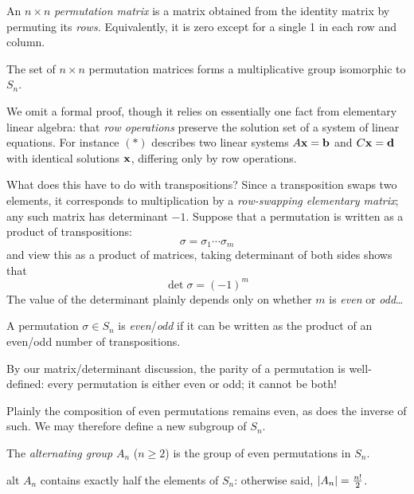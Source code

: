 \begin{defn}{}{}
	An $n\times n$ \emph{permutation matrix} is a matrix obtained from the identity matrix by permuting its \emph{rows.} Equivalently, it is zero except for a single 1 in each row and column.
\end{defn}

\begin{lemm}{}{}
	The set of $n\times n$ permutation matrices forms a multiplicative group isomorphic to $S_n$.
\end{lemm}

We omit a formal proof, though it relies on essentially one fact from elementary linear algebra: that \emph{row operations} preserve the solution set of a system of linear equations. For instance $(\ast)$ describes two linear systems $A{\mathbf{x}}={\mathbf{b}}$ and $C{\mathbf{x}}={\mathbf{d}}$ with identical solutions ${\mathbf{x}}$, differing only by row operations.
\smallbreak

What does this have to do with transpositions? Since a transposition swaps two elements, it corresponds to multiplication by a \emph{row-swapping elementary matrix}; any such matrix has determinant $-1$. Suppose that a permutation is written as a product of transpositions:
\[
	\sigma=\sigma_1\cdots\sigma_m
\]
and view this as a product of matrices, taking determinant of both sides shows that
\[
	\det\sigma=(-1)^m
\]
The value of the determinant plainly depends only on whether $m$ is \emph{even} or \emph{odd}\ldots

\begin{defn}{}{}
	A permutation $\sigma\in S_n$ is \emph{even}/\emph{odd} if it can be written as the product of an even/odd number of transpositions.
\end{defn}

By our matrix/determinant discussion, the parity of a permutation is well-defined: every permutation is either even or odd; it cannot be both!\smallbreak

Plainly the composition of even permutations remains even, as does the inverse of such. We may therefore define a new subgroup of $S_n$.

\begin{defn}{}{}
	The \emph{alternating group} $A_n$ ($n\ge 2$) is the group of even permutations in $S_n$.
\end{defn}

\begin{thm}{}{alt}
	$A_n$ contains exactly half the elements of $S_n$: otherwise said, $\left| A_n\right|=\frac{n!}{2}$.
\end{thm}

